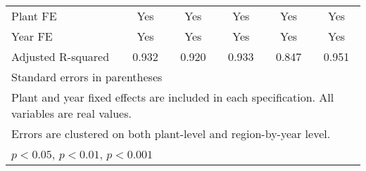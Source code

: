 \begin{table}[htbp]
\begin{tabular}{l*{5}{c}}
Plant FE        &      Yes         &      Yes         &      Yes         &      Yes         &      Yes         \\
Year FE         &      Yes         &      Yes         &      Yes         &      Yes         &      Yes         \\
Adjusted R-squared&    0.932         &    0.920         &    0.933         &    0.847         &    0.951         \\
\bottomrule
\multicolumn{6}{l}{\footnotesize Standard errors in parentheses}\\
\multicolumn{6}{l}{\footnotesize Plant and year fixed effects are included in each specification. All variables are real values.}\\
\multicolumn{6}{l}{\footnotesize Errors are clustered on both plant-level and region-by-year level. }\\
\multicolumn{6}{l}{\footnotesize \sym{*} \(p<0.05\), \sym{**} \(p<0.01\), \sym{***} \(p<0.001\)}\\
\end{tabular}
\end{table}
